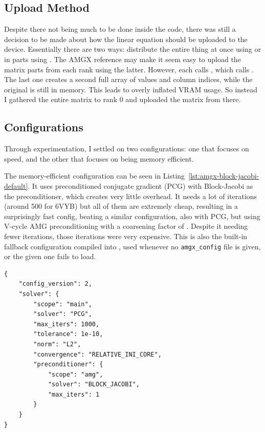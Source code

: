 \subsection{Upload Method}

Despite there not being much to be done inside the code, there was still a decision to be made about how the linear equation should be uploaded to the device.
Essentially there are two ways: distribute the entire thing at once using  or in parts using .
The AMGX reference %
may make it seem easy to upload the matrix parts from each rank using the latter.
However, each  calls , which calls .
The last one creates a second full array of values and column indices, while the original is still in memory.
This leads to overly inflated VRAM usage.
So instead I gathered the entire matrix to rank 0 and uploaded the matrix from there.

\subsection{Configurations}

Through experimentation, I settled on two configurations: one that focuses on speed, and the other that focuses on being memory efficient.

The memory-efficient configuration can be seen in Listing~\ref{lst:amgx-block-jacobi-default}.
It uses preconditioned conjugate gradient (PCG) with Block-Jacobi as the preconditioner, which creates very little overhead.
It needs a lot of iterations (around 500 for 6VYB) but all of them are extremely cheap, resulting in a surprisingly fast config, beating a similar configuration, also with PCG, but using V-cycle AMG preconditioning with a coarsening factor of .
Despite it needing fewer iterations, those iterations were very expensive.
This is also the built-in fallback configuration compiled into , used whenever no \texttt{amgx\_config} file is given, or the given one fails to load.

\begin{lstlisting}[style=configstyle,caption={Built-in default AMGX configuration: PCG with a Block-Jacobi preconditioner.},label={lst:amgx-block-jacobi-default}]
{
    "config_version": 2,
    "solver": {
        "scope": "main",
        "solver": "PCG",
        "max_iters": 1000,
        "tolerance": 1e-10,
        "norm": "L2",
        "convergence": "RELATIVE_INI_CORE",
        "preconditioner": {
            "scope": "amg",
            "solver": "BLOCK_JACOBI",
            "max_iters": 1
        }
    }
}
\end{lstlisting}

